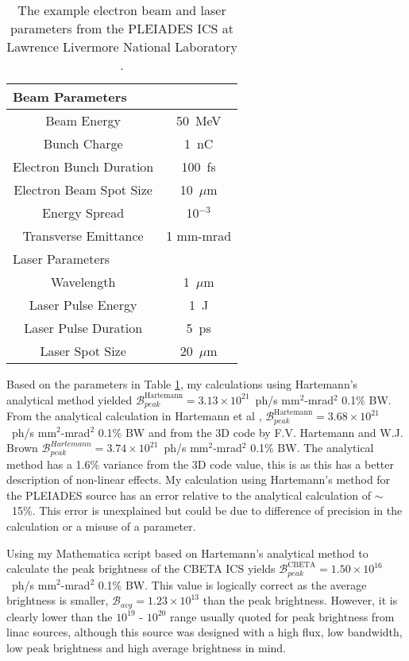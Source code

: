 \documentclass[10pt]{article}
\begin{document}
\begin{table}[H]
\centering
\begin{tabular}{cc}
\hline
\hline
\multicolumn{2}{l}{Beam Parameters} \\
\hline
Beam Energy & 50~MeV \\
Bunch Charge & 1~nC \\
Electron Bunch Duration & 100~fs \\
Electron Beam Spot Size & 10~$\mu$m \\
Energy Spread & 10$^{-3}$ \\
Transverse Emittance & 1 mm-mrad \\
\hline
\multicolumn{2}{l}{Laser Parameters} \\
\hline
Wavelength & 1~$\mu$m \\
Laser Pulse Energy & 1~J \\
Laser Pulse Duration & 5~ps \\
Laser Spot Size & 20~$\mu$m \\
\hline
\hline
\end{tabular}
\caption{The example electron beam and laser parameters from the PLEIADES ICS at Lawrence Livermore National Laboratory \cite{brown2004experimental}.}
\label{tab:exampleparam}
\end{table}

Based on the parameters in Table \ref{tab:exampleparam}, my calculations using Hartemann's analytical method yielded $\mathcal{B}^{\mathrm{Hartemann}}_{peak} = 3.13\times 10^{21}$~ph/s mm$^{2}$-mrad$^{2}$ 0.1\% BW. From the analytical calculation in Hartemann et al \cite{hartemann2005high}, $\mathcal{B}^{\mathrm{Hartemann}}_{peak} = 3.68\times 10^{21}$~ph/s mm$^{2}$-mrad$^{2}$ 0.1\% BW and from the 3D code by F.V. Hartemann and W.J. Brown \cite{brown2004three} $\mathcal{B}^{Hartemann}_{peak} = 3.74\times 10^{21}$~ph/s mm$^{2}$-mrad$^{2}$ 0.1\% BW. The analytical method has a 1.6\% variance from the 3D code value, this is as this has a better description of non-linear effects. My calculation using Hartemann's method for the PLEIADES source has an error relative to the analytical calculation of $\sim$~15\%. This error is unexplained but could be due to difference of precision in the calculation or a misuse of a parameter.

Using my Mathematica script based on Hartemann's analytical method to calculate the peak brightness of the CBETA ICS yields $\mathcal{B}^{\mathrm{CBETA}}_{peak} = 1.50\times 10^{16}$~ph/s mm$^{2}$-mrad$^{2}$ 0.1\% BW. This value is logically correct as the average brightness is smaller, $\mathcal{B}_{avg} = 1.23\times10^{13}$ than the peak brightness. However, it is clearly lower than the $10^{19}$ - $10^{20}$ range usually quoted for peak brightness from linac sources, although this source was designed with a high flux, low bandwidth, low peak brightness and high average brightness in mind.
\end{document}
